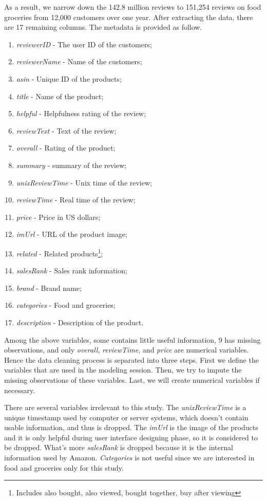 \documentclass[final, 3p,12pt,times,letter,twocolumn]{elsarticle}
\begin{document}
As a result, we narrow down the 142.8 million reviews to 151,254 reviews on food groceries from 12,000 customers over one year. After extracting the data, there are 17 remaining columns. The metadata is provided as follow.
\begin{enumerate}[$\cdot$]
\item \textit{reviewerID} - The user ID of the customers;
\item \textit{reviewerName} - Name of the customers;
\item \textit{asin} - Unique ID of the products;
\item \textit{title} - Name of the product;
\item \textit{helpful} - Helpfulness rating of the review;
\item \textit{reviewText} - Text of the review;
\item \textit{overall} - Rating of the product;
\item \textit{summary} - summary of the review;
\item \textit{unixReviewTime} - Unix time of the review;
\item \textit{reviewTime} - Real time of the review;
\item \textit{price} - Price in US dollars;
\item \textit{imUrl} - URL of the product image;
\item \textit{related} - Related products\footnote{Includes also bought, also viewed, bought together, buy after viewing};
\item \textit{salesRank} - Sales rank information;
\item \textit{brand} - Brand name;
\item \textit{categories} - Food and groceries;
\item \textit{description} - Description of the product.

\end{enumerate}

Among the above variables, some contains little useful information, 9 has missing observations, and only \textit{overall}, \textit{reviewTime}, and \textit{price} are numerical variables. Hence the data cleaning process is separated into three steps. First we define the variables that are used in the modeling session. Then, we try to impute the missing observations of these variables. Last, we will create numerical variables if necessary. 

There are several variables irrelevant to this study. The \textit{unixReviewTime} is a unique timestamp used by computer or server systems, which doesn't contain usable information, and thus is dropped. The \textit{imUrl} is the image of the products and it is only helpful during user interface designing phase, so it is considered to be dropped. What's more \textit{salesRank} is dropped because it is the internal information used by Amazon. \textit{Categories} is not useful since we are interested in food and groceries only for this study.
\end{document}
